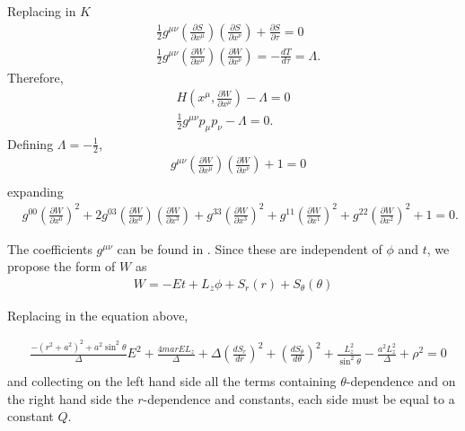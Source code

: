 Replacing in $K$
\begin{align*}
	&\frac{1}{2}g^{\mu\nu}\left(\frac{\partial S}{\partial x^\mu}\right) \left(\frac{\partial S}{\partial x^\nu}\right)  + \frac{\partial S}{\partial\tau} = 0\\
	&\frac{1}{2}g^{\mu\nu}\left(\frac{\partial W}{\partial x^\mu}\right) \left(\frac{\partial W}{\partial x^\nu} \right) = - \frac{dT}{d\tau} = \Lambda.
\end{align*} 
Therefore,
\begin{align}
H\left(x^\mu, \frac{\partial W}{\partial x^\mu} \right) - \Lambda = 0\\
\frac{1}{2}g^{\mu\nu}p_\mu p_\nu - \Lambda = 0.
\end{align}
Defining $\Lambda  = -\frac{1}{2}$,
\begin{align*}
	&g^{\mu\nu}\left(\frac{\partial W}{\partial x^\mu}\right) \left(\frac{\partial W}{\partial x^\nu} \right) +1 = 0\\
\end{align*} 
expanding
\begin{align*}
	&g^{00}\left(\frac{\partial W}{\partial x^0}\right)^2  +2g^{03}\left(\frac{\partial W}{\partial x^0}\right) \left(\frac{\partial W}{\partial x^3} \right) + g^{33}\left(\frac{\partial W}{\partial x^3}\right)^2  + g^{11}\left(\frac{\partial W}{\partial x^1}\right) ^2  + g^{22}\left(\frac{\partial W}{\partial x^2}\right) ^2+1 = 0.
\end{align*} 

The coefficients $g^{\mu\nu}$ can be found in \cite{Frolov, Raine}. Since these are independent of $\phi$ and $t$, we propose the form of $W$ \cite{Bambi} as
\begin{align*}
	W = -Et + L_z\phi + S_r(r) + S_{\theta}(\theta)
\end{align*} 

Replacing in the equation above,

\begin{align*}
	&\frac{-(r^2+a^2)^2 + a^2\sin^2\theta
}{\Delta}E^2 + \frac{4marEL_z}{\Delta} + \Delta\left(\frac{dS_r}{dr}\right)^2 + \left(\frac{dS_{\theta}}{d\theta}\right)^2+\frac{L_z^2}{\sin^2\theta}-\frac{a^2L_z^2}{\Delta}+\rho^2 = 0\\
\end{align*} 
and collecting on the left hand side all the terms containing $\theta$-dependence and on the right hand side the $r$-dependence and constants, each side must be equal to a constant $Q$.\\

